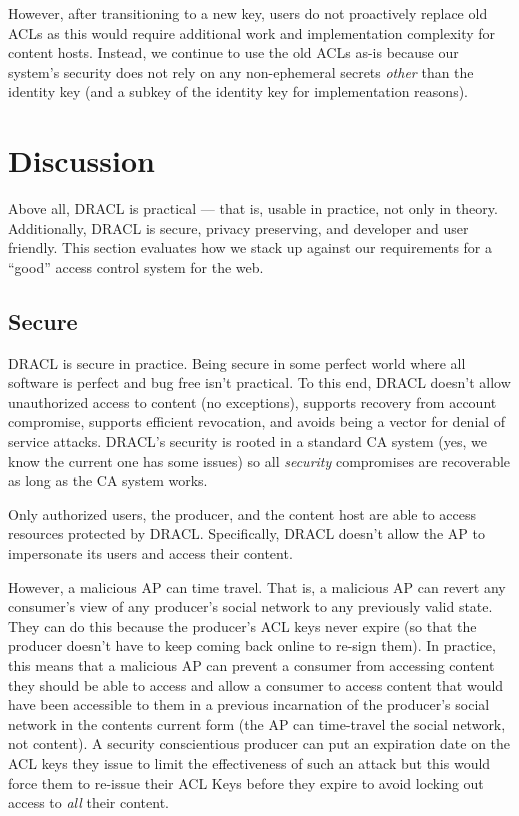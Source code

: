 \documentclass[pdftex,12pt,a4papaer,twoside,notitlepage]{report}
\begin{document}
However, after transitioning to a new key, users do not proactively replace old
ACLs as this would require additional work and implementation complexity for
content hosts. Instead, we continue to use the old ACLs as-is because our
system's security does not rely on any non-ephemeral secrets \emph{other} than
the identity key (and a subkey of the identity key for implementation reasons).

\chapter{Discussion}

Above all, DRACL is practical --- that is, usable in practice, not only in
theory. Additionally, DRACL is secure, privacy preserving, and developer and
user friendly. This section evaluates how we stack up against our requirements
for a ``good'' access control system for the web.

\section{Secure}
\label{sub:secure}

DRACL is secure in practice. Being secure in some perfect world where all
software is perfect and bug free isn't practical. To this end, DRACL doesn't
allow unauthorized access to content (no exceptions), supports recovery from
account compromise, supports efficient revocation, and avoids being a vector for
denial of service attacks. DRACL's security is rooted in a standard CA system
(yes, we know the current one has some issues) so all \emph{security}
compromises are recoverable as long as the CA system works.

Only authorized users, the producer, and the content host are able to access
resources protected by DRACL\@. Specifically, DRACL doesn't allow the AP to
impersonate its users and access their content.

However, a malicious AP can time travel. That is, a malicious AP can revert any
consumer's view of any producer's social network to any previously valid state.
They can do this because the producer's ACL keys never expire (so that the
producer doesn't have to keep coming back online to re-sign them). In practice,
this means that a malicious AP can prevent a consumer from accessing content
they should be able to access and allow a consumer to access content that would
have been accessible to them in a previous incarnation of the producer's social
network in the contents current form (the AP can time-travel the social network,
not content). A security conscientious producer can put an expiration date on
the ACL keys they issue to limit the effectiveness of such an attack but this
would force them to re-issue their ACL Keys before they expire to avoid locking
out access to \emph{all} their content.
\end{document}
